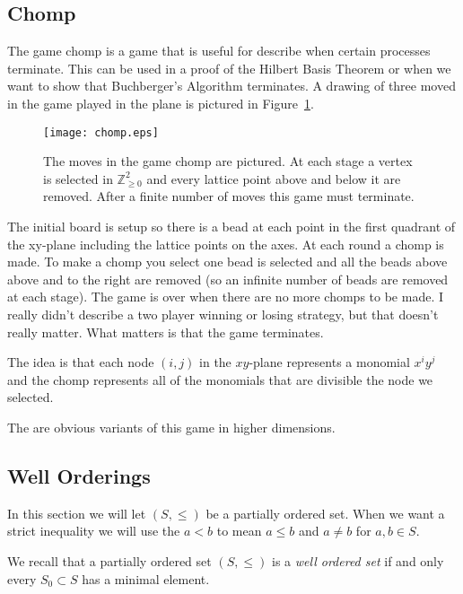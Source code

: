 \documentclass[12pt]{book}
\numberwithin{equation}{section}
\theoremstyle{definition}
\theoremstyle{remark}
\newcommand{\ZZ}{\mathbb{Z}}
\begin{document}
\subsection{Chomp}\label{S:chomp}

The game chomp is a game that is useful for describe when certain processes terminate. 
This can be used in a proof of the Hilbert Basis Theorem or when we want to show that Buchberger's Algorithm terminates. 
A drawing of three moved in the game played in the plane is pictured in Figure~\ref{F:chomp}.
\begin{figure}[h]
	\begin{center}
	\texttt{[image: chomp.eps]}
	\end{center}
\caption{The moves in the game chomp are pictured.
At each stage a vertex is selected in $\ZZ_{\geq 0}^2$ and every lattice point above and below it are removed. 
After a finite number of moves this game must terminate. }\label{F:chomp}
\end{figure}

The initial board is setup so there is a bead at each point in the first quadrant of the xy-plane including the lattice points on the axes. 
At each round a chomp is made. 
To make a chomp you select one bead is selected and all the beads above above and to the right are removed (so an infinite number of beads are removed at each stage). 
The game is over when there are no more chomps to be made.
I really didn't describe a two player winning or losing strategy, but that doesn't really matter. 
What matters is that the game terminates. 

The idea is that each node $(i,j)$ in the $xy$-plane represents a monomial $x^iy^j$ and the chomp represents all of the monomials that are divisible the node we selected. 

The are obvious variants of this game in higher dimensions.

\subsection{Well Orderings}
In this section we will let $(S,\leq)$ be a partially ordered set.
When we want a strict inequality we will use the $a<b$ to mean $a\leq b$ and $a\neq b$ for $a,b\in S$. 

We recall that a partially ordered set $(S,\leq)$ is a \emph{well ordered set} if and only every $S_0 \subset S$ has a minimal element. 
\end{document}
